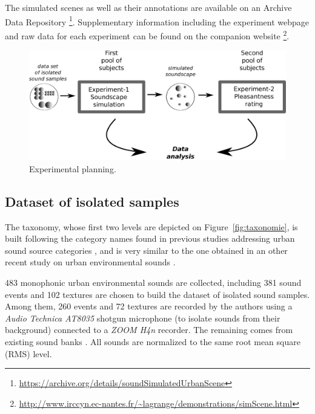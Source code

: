 \documentclass[twoside,twocolumn]{article}
\begin{document}
The simulated scenes as well as their annotations are available on an Archive Data Repository \footnote{\url{https://archive.org/details/soundSimulatedUrbanScene}}. Supplementary information including the experiment webpage and raw data for each experiment can be found on the companion website \footnote{\url{http://www.irccyn.ec-nantes.fr/~lagrange/demonstrations/simScene.html}}.

\begin{figure}[t]
\begin{center}
\includegraphics[width=.4\paperwidth]{../gfx/5.eps}
\caption{\label{fig:expLan} Experimental planning.}
\end{center}
\end{figure}

\subsection{Dataset of isolated samples}

The taxonomy, whose first two levels are depicted on Figure~\ref{fig:taxonomie}, is built following the category names found in previous studies addressing urban sound source categories \cite{maffiolo_caracterisation_1999,dubois2006cognitive,guastavino_categorization_2007, guastavino_ideal_2006, niessen_categories_2010, brown_towards_2011}, and is very similar to the one obtained in an other recent study on urban environmental sounds \cite{Salamon14}. 

483 monophonic urban environmental sounds are collected, including 381 sound events and 102 textures are chosen to build the dataset of isolated sound samples. Among them, 260 events and 72 textures are recorded by the authors using a \textit{Audio Technica AT8035} shotgun microphone (to isolate sounds from their background) connected to a \textit{ZOOM H4n} recorder. The remaining comes from existing sound banks  . All sounds are normalized to the same root mean square (RMS) level.
\end{document}
